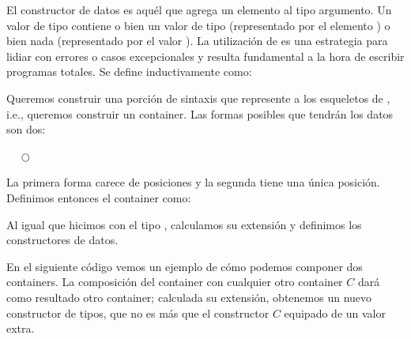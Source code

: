 
\begin{example} El constructor de datos  es aquél que agrega un elemento al tipo argumento.
Un valor de tipo   contiene o bien un valor  de tipo  (representado por el elemento   ) o bien nada (representado por el valor ). La utilización de  es una estrategia para lidiar con errores o casos excepcionales y resulta fundamental a la hora de escribir programas totales. 
  Se define inductivamente como:
  

  Queremos construir una porción de sintaxis que represente a los esqueletos de , i.e., queremos construir un container. Las formas posibles que tendrán los datos son dos:

  \begin{center}
   $\quad$ $\bigcirc$
  \end{center}
  
  La primera forma carece de posiciones y la segunda tiene una única posición. Definimos entonces el container  como:


  Al igual que hicimos con el tipo , calculamos su extensión y definimos los constructores de datos.

\end{example}
\vspace{2ex}



\begin{example}\label{ex:cont:comp} 
  En el siguiente código vemos un ejemplo de cómo podemos componer dos containers. La composición del container  con cualquier otro container $C$ dará como resultado otro container; calculada su extensión, obtenemos un nuevo constructor de tipos, que no es más que el constructor $C$ equipado de un valor extra. 

  
\end{example}
\vspace{2ex}



